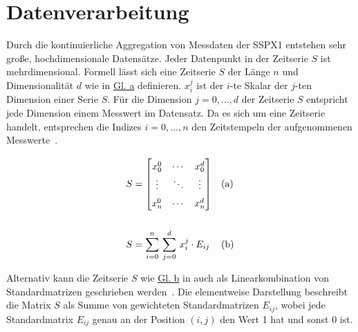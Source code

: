 \newpage
\section{Datenverarbeitung}
Durch die kontinuierliche Aggregation von Messdaten der SSPX1 entstehen sehr große, hochdimensionale Datensätze. Jeder Datenpunkt in
der Zeitserie $S$ ist mehrdimensional. Formell lässt sich eine Zeitserie $S$ der Länge $n$ und Dimensionalität $d$ wie in
\hyperref[eq:timeseries_matrix_sum]{Gl. a} definieren. $x_{i}^{j}$ ist der $i$-te Skalar der $j$-ten
Dimension einer Serie $S$. Für die Dimension $j={0,\dots,d}$ der Zeitserie $S$ entspricht jede Dimension einem Messwert im Datensatz. Da es
sich um eine Zeitserie handelt, entsprechen die Indizes $i={0, \dots, n}$ den Zeitstempeln der aufgenommenen Messwerte~\cite{Wenig2024}.

\begin{equation}
    \setcounter{equation}{0}
        \begin{subequations}
        \renewcommand{\arraystretch}{1.5}
        \begin{aligned}
            S &=
            \begin{bmatrix} 
                x_{0}^{0} & \cdots & x_{0}^{d} \\
                \vdots & \ddots & \vdots \\
                x_{n}^{0} & \cdots & x_{n}^{d} 
            \end{bmatrix} 
            && \text{(a)} \\[1.5em]
            S &= \sum_{i=0}^{n}\,\sum_{j=0}^{d}\,x_{i}^{j} \cdot E_{ij}
            && \text{(b)}
        \end{aligned}
    \end{subequations}
\label{eq:timeseries_matrix_sum}
\end{equation}


Alternativ kann die Zeitserie $S$ wie \hyperref[eq:timeseries_matrix_sum]{Gl. b} in auch als Linearkombination
von Standardmatrizen geschrieben werden~\cite[S.~8]{Voigt2012}. Die elementweise Darstellung beschreibt die Matrix $S$ als Summe von
gewichteten Standardmatrizen $E_{ij}$, wobei jede Standardmatrix $E_{ij}$ genau an der Position $(i,j)$ den Wert 1 hat und sonst 0 ist.